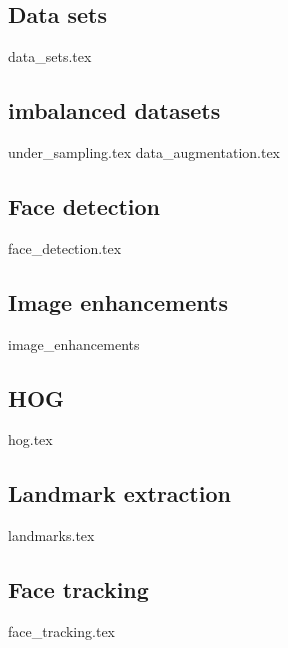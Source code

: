 \subsection{Data sets}
{data_sets.tex}

\subsection{imbalanced datasets}
{under_sampling.tex}
{data_augmentation.tex}

\subsection{Face detection}
{face_detection.tex}

\subsection{Image enhancements}
{image_enhancements}

\subsection{HOG}
{hog.tex}

\subsection{Landmark extraction}
{landmarks.tex}

\subsection{Face tracking}
{face_tracking.tex}